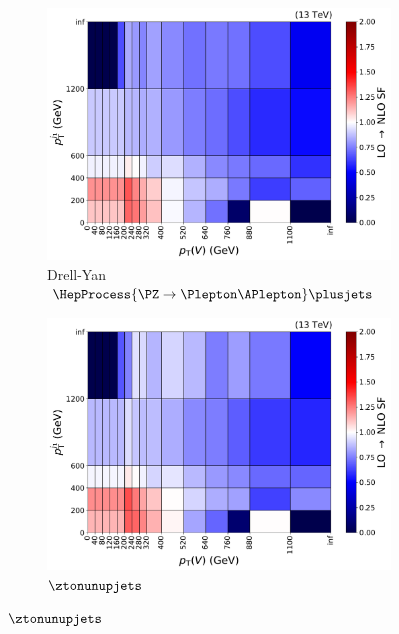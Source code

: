 \begin{figure}[htbp]
    \centering
    \begin{subfigure}[b]{0.49\textwidth}
        \includegraphics[width=\textwidth]{figures/nlo_k_factors/2D_zll.pdf}
        \caption{Drell-Yan $\HepProcess{\PZ \to \Plepton\APlepton}\plusjets$}
    \end{subfigure}
    \hfill
    \begin{subfigure}[b]{0.49\textwidth}
        \includegraphics[width=\textwidth]{figures/nlo_k_factors/2D_znunu.pdf}
        \caption{$\ztonunupjets$}
    \end{subfigure}


\end{figure}
